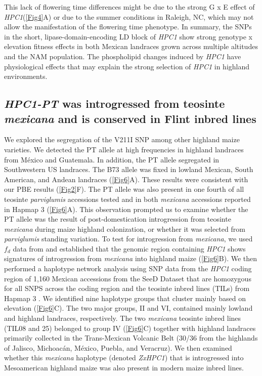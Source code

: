 \documentclass[9pt,twocolumn,twoside,lineno]{biorxiv}
\newcommand{\mex}{\textit{mexicana}\xspace}
\newcommand{\hpc}{\textit{HPC1}\xspace}
\newcommand{\parv}{\textit{parviglumis}\xspace}
\begin{document}
This lack of flowering time differences might be due to the strong G x E effect of \hpc (\cref{Fig4}A) or due to the summer conditions in Raleigh, NC, which may not allow the manifestation of the flowering time phenotype.
In summary, the SNPs in the short, lipase-domain-encoding LD block of \hpc show strong genotype x elevation fitness effects in both Mexican landraces grown across multiple altitudes and the NAM population.
The phospholipid changes induced by \hpc have physiological effects that may explain the strong selection of \hpc in highland environments.

\subsection{\textit{HPC1-PT} was introgressed from teosinte \mex and is conserved in Flint inbred lines}
We explored the segregation of the V211I SNP among other highland maize varieties.
We detected the PT allele at high frequencies in highland landraces from M\'exico and Guatemala. 
In addition, the PT allele segregated in Southwestern US landraces. 
The B73 allele was fixed in lowland Mexican, South American, and Andean landraces (\cref{Fig6}A). 
These results were consistent with our PBE results (\cref{Fig2}F).
The PT allele was also present in one fourth of all teosinte \parv accessions tested and in both \mex accessions reported in Hapmap 3 \cite{Bukowski2017-ng} (\cref{Fig6}A). 
This observation prompted us to examine whether the PT allele was the result of post-domestication introgression from teosinte \mex during maize highland colonization, or whether it was selected from \parv standing variation.
To test for introgression from \mex, we used \(f_d\) data from \cite{Gonzalez-Segovia2019-jy} and established that the genomic region containing \hpc shows signatures of introgression from \mex into highland maize (\cref{Fig6}B).
We then performed a haplotype network analysis using SNP data from the \hpc coding region of 1,160 Mexican accessions from the SeeD Dataset \cite{Romero_Navarro2017-cn} that are homozygous for all SNPS across the coding region and the teosinte inbred lines (TILs) from Hapmap 3 \cite{Bukowski2017-ng}.   
We identified nine haplotype groups that cluster mainly based on elevation (\cref{Fig6}C). 
The two major groups, II and VI, contained mainly lowland and highland landraces, respectively. 
The two \mex teosinte inbred lines (TIL08 and 25) belonged to group IV  (\cref{Fig6}C) together with highland landraces primarily collected in the Trans-Mexican Volcanic Belt (30/36 from the highlands of Jalisco, Michoacán, M\'exico, Puebla, and Veracruz).
We then examined whether this \mex haplotype (denoted \textit{ZxHPC1}) that is introgressed into Mesoamerican highland maize was also present in modern maize inbred lines. 
\end{document}
